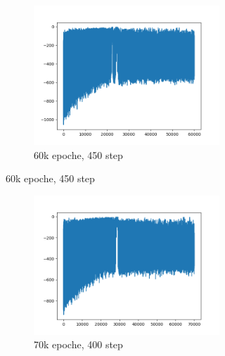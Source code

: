\begin{figure}[H]
\begin{subfigure}{\textwidth}
		\begin{subfigure}{.33\textwidth}
			\centering
			\includegraphics[width=1\linewidth]{img/plot_60k_450.png}
			\caption{60k epoche, 450 step}
		\end{subfigure}%
	\end{subfigure}
	\begin{subfigure}{\textwidth}
		\centering
		\begin{subfigure}{.33\textwidth}
			\centering
			\includegraphics[width=1\linewidth]{img/plot_70k_400.png}
			\caption{70k epoche, 400 step}
		\end{subfigure}%
		\begin{subfigure}{.33\textwidth}
			\centering

\end{subfigure}
\end{subfigure}
\end{figure}
